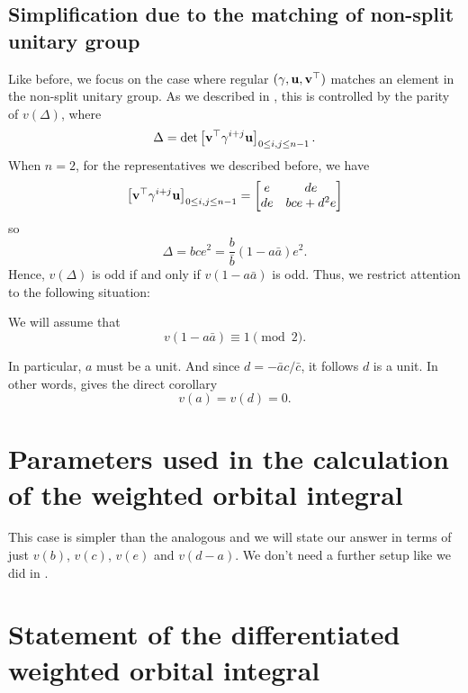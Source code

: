 \subsection{Simplification due to the matching of non-split unitary group}
Like before, we focus on the case where regular $(\gamma, \mathbf u, \mathbf v^\top)$
matches an element in the non-split unitary group.
As we described in ,
this is controlled by the parity of $v(\Delta)$, where
\[ \Delta = \det \left[ \mathbf v^\top \gamma^{i+j} \mathbf u \right]_{0 \le i,j \le n-1}. \]
When $n=2$, for the representatives we described before,
we have
\[ \left[ \mathbf v^\top \gamma^{i+j} \mathbf u \right]_{0 \le i,j \le n-1}
  = \begin{bmatrix} e & de \\ de & bce + d^2e \end{bmatrix} \]
so
\[ \Delta = bce^2 = \frac{b}{\bar b}(1-a \bar a) e^2 . \]
Hence, $v(\Delta)$ is odd if and only if $v(1-a \bar a)$ is odd.
Thus, we restrict attention to the following situation:
\begin{assume}
  \label{assume:a_odd}
  We will assume that
  \[ v(1-a \bar a) \equiv 1 \pmod 2. \]
\end{assume}
In particular, $a$ must be a unit.
And since $d = -\bar a c / \bar c$, it follows $d$ is a unit.
In other words,  gives the direct corollary
\[ v(a) = v(d) = 0. \]

\section{Parameters used in the calculation of the weighted orbital integral}
This case is simpler than the analogous 
and we will state our answer in terms of just $v(b)$, $v(c)$, $v(e)$ and $v(d-a)$.
We don't need a further setup like we did in .

\section{Statement of the differentiated weighted orbital integral}
